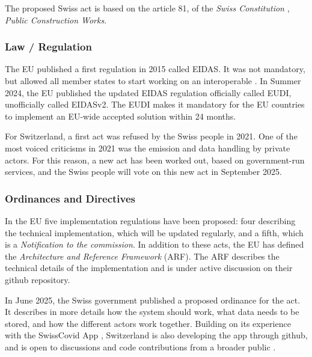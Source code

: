The proposed Swiss \eid act is based on the article 81, of the \emph{Swiss Constitution} \cite{SwissConstitution}, \emph{Public Construction Works}.

\subsubsection{Law / Regulation}

The EU published a first regulation in 2015 called EIDAS\cite{EIDAS}.
It was not mandatory, but allowed all member states to start working on an
interoperable \eid.
In Summer 2024, the EU published the updated EIDAS regulation 
officially called EUDI\cite{EUDI}, unofficially called EIDASv2.
The EUDI makes it mandatory for the EU countries to implement an EU-wide accepted
\eid solution within 24 months.

For Switzerland, a first \eid{} act was refused by the Swiss people in 2021\cite{CHeID21}.
One of the most voiced criticisms in 2021 was the emission and data handling by
private actors.
For this reason, a new \eid{} act has been worked out, based on government-run services,
and the Swiss people will vote on this new act in September 2025\cite{SwiyuAct25}.

\subsubsection{Ordinances and Directives}

In the EU five implementation regulations have been proposed\cite{EUDIReg24}:
four describing the technical implementation, which will be
updated regularly, and a fifth, which is a \emph{Notification to the commission}.
In addition to these acts, the EU has defined the \emph{Architecture and Reference Framework
}(ARF)\cite{EUARF25}.
The ARF describes the technical details of the implementation and is under active
discussion on their github repository.

In June 2025, the Swiss government published a proposed ordinance for the
\eid act\cite{SwiyuOrdinance25}.
It describes in more details how the system should work, what data needs to be stored,
and how the different actors work together.
Building on its experience with the SwissCovid App \cite{SwisscovidGithub}, Switzerland is also
developing the \swiyu app through github, and is open to discussions
and code contributions from a broader public \cite{SwiyuGithub}.
